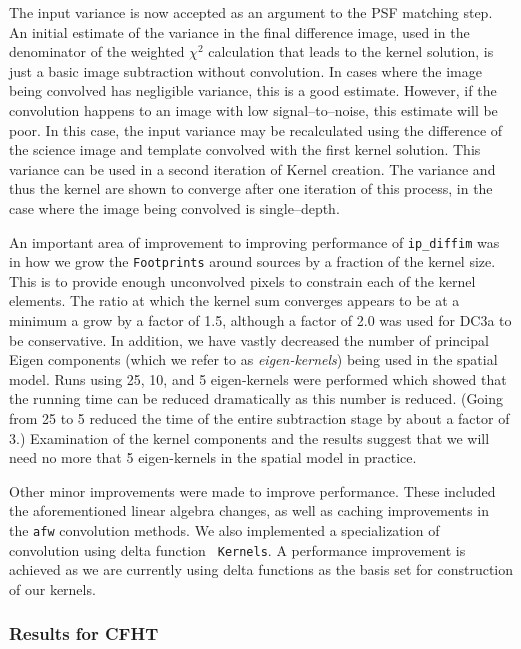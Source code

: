 The input variance is now accepted as an argument to the PSF matching
step.  An initial estimate of the variance in the final difference
image, used in the denominator of the weighted $\chi^2$ calculation
that leads to the kernel solution, is just a basic image subtraction
without convolution.  In cases where the image being convolved has
negligible variance, this is a good estimate.  However, if the
convolution happens to an image with low signal--to--noise, this
estimate will be poor.  In this case, the input variance may be
recalculated using the difference of the science image and template
convolved with the first kernel solution.  This variance can be used
in a second iteration of Kernel creation.  The variance and thus the
kernel are shown to converge after one iteration of this process, in
the case where the image being convolved is single--depth.

An important area of improvement to improving performance of 
{\tt ip\_diffim} was in how we grow the {\tt Footprints} around
sources by a fraction of the kernel size.  This is to provide enough
unconvolved pixels to constrain each of the kernel elements.  The
ratio at which the kernel sum converges appears to be at a minimum a
grow by a factor of 1.5, although a factor of 2.0 was used for DC3a to
be conservative.  In addition, we have vastly decreased the number of
principal Eigen components (which we refer to as {\it eigen-kernels})
being used in the spatial model.  Runs using 25, 10, and 5
eigen-kernels were performed which showed that the running time can be
reduced dramatically as this number is reduced.  (Going from 25 to 5
reduced the time of the entire subtraction stage by about a factor of
3.) Examination of the kernel components and the results suggest that
we will need no more that 5 eigen-kernels in the spatial model in 
practice.  

Other minor improvements were made to improve performance.  These
included the aforementioned linear algebra changes, as well as
caching improvements in the {\tt afw} convolution methods.  We also 
implemented a specialization of convolution using delta function {\tt
Kernels}.  A performance improvement is achieved as we are currently
using delta functions as the basis set for construction of our
kernels. 


\subsubsection{Results for CFHT}

